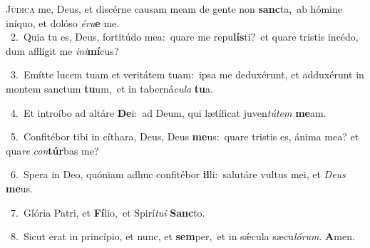 \lettrine{\initial\textcolor{\initialcolor}{J}}{údica} me, Deus, et discérne causam meam de gente non \textbf{sanc}\-ta,~\star ab hómine iníquo, et dolóso \textit{é}\-\textit{ru}\textbf{e} me.\\
{\numbfont\textcolor{\numbcolor}{~2.}}~Quia tu es, Deus, fortitúdo mea:~\dagger quare me repu\-\textbf{lís}\-ti?~\star et quare tristis incédo, dum afflígit me \textit{in}\-\textit{i}\textbf{mí}cus?\par
{\numbfont\textcolor{\numbcolor}{~3.}}~Emítte lucem tuam et veritátem tuam:~\dagger ipsa me deduxérunt, et adduxérunt in montem sanctum \textbf{tu}\-um,~\star et in taberná\-\textit{cu}\-\textit{la} \textbf{tu}\-a.\par
{\numbfont\textcolor{\numbcolor}{~4.}}~Et introíbo ad altáre \textbf{De}\-i:~\star ad Deum, qui lætíficat juven\-\textit{tú}\-\textit{tem} \textbf{me}\-am.\par
{\numbfont\textcolor{\numbcolor}{~5.}}~Confitébor tibi in cíthara, Deus, Deus \textbf{me}\-us:~\star quare tristis es, ánima mea? et qua\textit{re} \textit{con}\-\textbf{túr}bas me?\par
{\numbfont\textcolor{\numbcolor}{~6.}}~Spera in Deo, quóniam adhuc confitébor \textbf{il}\-li:~\star salutáre vultus mei, et \textit{De}\-\textit{us} \textbf{me}\-us.\par
{\numbfont\textcolor{\numbcolor}{~7.}}~Glória Patri, et \textbf{Fí}\-lio,~\star et Spirí\-\textit{tu}\-\textit{i} \textbf{Sanc}\-to.\par
{\numbfont\textcolor{\numbcolor}{~8.}}~Sicut erat in princípio, et nunc, et \textbf{sem}\-per,~\star et in sǽcula sæcu\-\textit{ló}\-\textit{rum}. \textbf{A}\-men.\par

